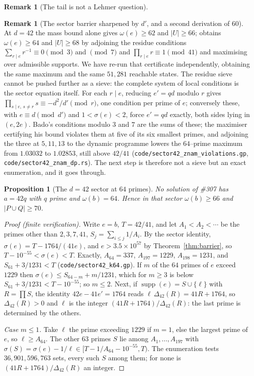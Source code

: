 \documentclass[11pt]{article}
\newtheorem{proposition}[theorem]{Proposition}
\theoremstyle{definition}
\newtheorem{remark}[theorem]{Remark}
\begin{document}
\begin{remark}[The tail is not a Lehmer question]
\begin{remark}[The sector barrier sharpened by $d'$, and a second derivation of $60$]
At $d=42$ the mass bound alone gives $\omega(e)\ge62$ and $|U|\ge66$; \cite{Bado2026b} obtains
$\omega(e)\ge64$ and $|U|\ge68$ by adjoining the residue conditions
$\sum_{r\mid e}r^{-1}\equiv0\pmod 3$ and $\pmod 7$ and $\prod_{r\mid e}r\equiv1\pmod{41}$ and
maximising over admissible supports. We have re-run that certificate independently, obtaining the
same maximum and the same $51{,}281$ reachable states. The residue sieve cannot be pushed further as
a sieve: the complete system of local conditions is the sector equation itself. For each $r\mid e$,
reducing $e'=qd$ modulo $r$ gives $\prod_{s\mid e,\,s\ne r}s\equiv-d^2/d'\pmod r$, one condition
per prime of $e$; conversely these, with $e\equiv d\pmod{d'}$ and $1<\sigma(e)<2$, force $e'=qd$
exactly, both sides lying in $(e,2e)$. Bado's conditions modulo $3$ and $7$ are the sums of these;
the maximiser certifying his bound violates them at five of its six smallest primes, and adjoining
the three at $5,11,13$ to the dynamic programme lowers the $64$--prime maximum from $1.03032$ to
$1.02853$, still above $42/41$ \textup{(\texttt{code/sector42\_znam\_violations.gp},
\texttt{code/sector42\_znam\_dp.rs})}. The next step is therefore not a sieve but an exact
enumeration, and it goes through.
\end{remark}

\begin{proposition}[The $d=42$ sector at $64$ primes]\label{prop:sector42}
No solution of \#307 has $a=42q$ with $q$ prime and $\omega(b)=64$. Hence in that sector
$\omega(b)\ge66$ and $|P\cup Q|\ge70$.
\end{proposition}

\begin{proof}[Proof (finite verification)]
Write $e=b$, $T=42/41$, and let $A_1<A_2<\cdots$ be the primes other than $2,3,7,41$, $S_j=\sum_{i\le j}1/A_i$.
By the sector identity, $\sigma(e)=T-1764/(41e)$, and $e>3.5\times10^{57}$ by Theorem~\ref{thm:barrier},
so $T-10^{-55}<\sigma(e)<T$. Exactly, $A_{64}=337$, $A_{197}=1229$, $A_{198}=1231$, and
$S_{61}+3/1231<T$ \textup{(\texttt{code/sector42\_k64.gp})}. If $m$ of the $64$ primes of $e$ exceed
$1229$ then $\sigma(e)\le S_{64-m}+m/1231$, which for $m\ge3$ is below $S_{61}+3/1231<T-10^{-55}$; so
$m\le2$. Next, if $\operatorname{supp}(e)=S\cup\{\ell\}$ with $R=\prod S$, the identity
$42e-41e'=1764$ reads $\ell\,\Delta_{42}(R)=41R+1764$, so $\Delta_{42}(R)>0$ and $\ell$ is the integer
$(41R+1764)/\Delta_{42}(R)$: the last prime is determined by the others.

\emph{Case $m\le1$.} Take $\ell$ the prime exceeding $1229$ if $m=1$, else the largest prime of $e$, so
$\ell\ge A_{64}$. The other $63$ primes $S$ lie among $A_1,\dots,A_{197}$ with
$\sigma(S)=\sigma(e)-1/\ell\in[T-1/A_{64}-10^{-55},T)$. The enumeration tests $36{,}901{,}596{,}763$ sets, every
such $S$ among them; for none is $(41R+1764)/\Delta_{42}(R)$ an integer.


\end{proof}
\end{remark}
\end{document}
